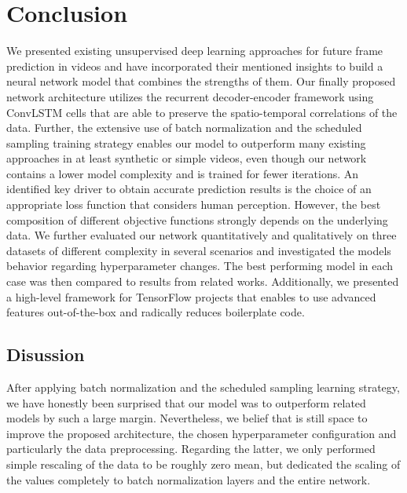 
\chapter{Conclusion} \label{chapter:conclusion}

We presented existing unsupervised deep learning approaches for future frame prediction in videos and have incorporated their mentioned insights to build a neural network model that combines the strengths of them. Our finally proposed network architecture utilizes the recurrent decoder-encoder framework using ConvLSTM cells that are able to preserve the spatio-temporal correlations of the data. Further, the extensive use of batch normalization and the scheduled sampling training strategy enables our model to outperform many existing approaches in at least synthetic or simple videos, even though our network contains a lower model complexity and is trained for fewer iterations. An identified key driver to obtain accurate prediction results is the choice of an appropriate loss function that considers human perception. However, the best composition of different objective functions strongly depends on the underlying data. We further evaluated our network quantitatively and qualitatively on three datasets of different complexity in several scenarios and investigated the models behavior regarding hyperparameter changes. The best performing model in each case was then compared to results from related works. Additionally, we presented a high-level framework for TensorFlow projects that enables to use advanced features out-of-the-box and radically reduces boilerplate code.

\section{Disussion}

After applying batch normalization and the scheduled sampling learning strategy, we have honestly been surprised that our model was to outperform related models by such a large margin. Nevertheless, we belief that is still space to improve the proposed architecture, the chosen hyperparameter configuration and particularly the data preprocessing. Regarding the latter, we only performed simple rescaling of the data to be roughly zero mean, but dedicated the scaling of the values completely to batch normalization layers and the entire network.

